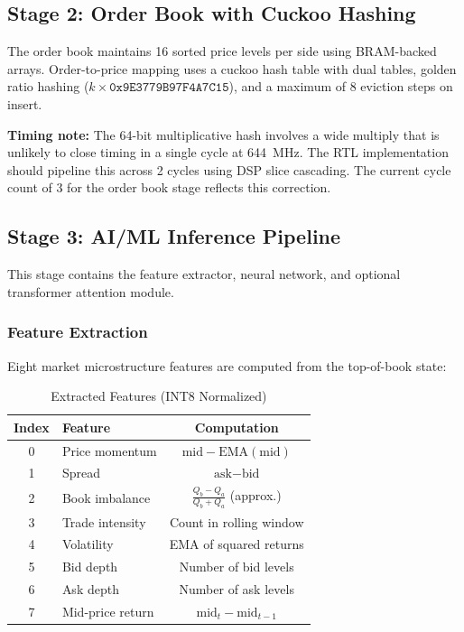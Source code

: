 \documentclass[conference,10pt]{IEEEtran}
\begin{document}
\subsection{Stage 2: Order Book with Cuckoo Hashing}

The order book maintains 16 sorted price levels per side using BRAM-backed arrays. Order-to-price mapping uses a cuckoo hash table \cite{pagh2004} with dual tables, golden ratio hashing ($k \times \texttt{0x9E3779B97F4A7C15}$), and a maximum of 8 eviction steps on insert.

\textbf{Timing note:} The 64-bit multiplicative hash involves a wide multiply that is unlikely to close timing in a single cycle at 644~MHz. The RTL implementation should pipeline this across 2 cycles using DSP slice cascading. The current cycle count of 3 for the order book stage reflects this correction.

\subsection{Stage 3: AI/ML Inference Pipeline}

This stage contains the feature extractor, neural network, and optional transformer attention module.

\subsubsection{Feature Extraction}

Eight market microstructure features are computed from the top-of-book state:

\begin{table}[h]
\centering
\caption{Extracted Features (INT8 Normalized)}
\label{tab:features}
\begin{tabular}{@{}clc@{}}
\toprule
Index & Feature & Computation \\
\midrule
0 & Price momentum & $\text{mid} - \text{EMA}(\text{mid})$ \\
1 & Spread & $\text{ask} - \text{bid}$ \\
2 & Book imbalance & $\frac{Q_b - Q_a}{Q_b + Q_a}$ (approx.) \\
3 & Trade intensity & Count in rolling window \\
4 & Volatility & EMA of squared returns \\
5 & Bid depth & Number of bid levels \\
6 & Ask depth & Number of ask levels \\
7 & Mid-price return & $\text{mid}_t - \text{mid}_{t-1}$ \\
\bottomrule
\end{tabular}
\end{table}
\end{document}
